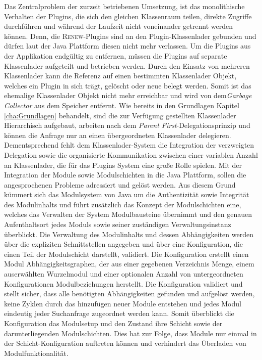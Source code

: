 			Das Zentralproblem der zurzeit betriebenen Umsetzung, ist das monolithische Verhalten der Plugins, die sich den gleichen Klassenraum teilen, direkte Zugriffe durchführen und während der Laufzeit nicht voneinander getrennt werden können. Denn, die \textsc{Renew}-Plugins sind an den Plugin-Klassenlader gebunden und dürfen laut der Java Plattform diesen nicht mehr verlassen. 
			Um die Plugins aus der Applikation endgültig zu entfernen, müssen die Plugins auf separate Klassenlader aufgeteilt und betrieben werden. Durch den Einsatz von mehreren Klassenlader kann die Referenz auf einen bestimmten Klassenlader Objekt, welches ein Plugin in sich trägt, gelöscht oder neue belegt werden. Somit ist das ehemalige Klassenlader Objekt nicht mehr erreichbar und wird von dem\textit{Garbage Collector} aus dem Speicher entfernt.\bigbreak  
			Wie bereits in den Grundlagen Kapitel \ref{cha:Grundlagen} behandelt, sind die zur Verfügung gestellten Klassenlader Hierarchisch aufgebaut, arbeiten nach dem \textit{Parent First}-Delegationsprinzip und können die Anfrage nur an einen übergeordneten Klassenlader delegieren. Dementsprechend fehlt dem Klassenlader-System die Integration der verzweigten Delegation sowie die organisierte Kommunikation zwischen einer variablen Anzahl an Klassenlader, die für das Plugins System eine große Rolle spielen.\newline
			Mit der Integration der Module sowie Modulschichten in die Java Plattform, sollen die angesprochenen Probleme adressiert und gelöst werden. Aus diesem Grund kümmert sich das Modulsystem von Java um die Authentizität sowie Integrität des Modulinhalts und führt zusätzlich das Konzept der Modulschichten eine, welches das Verwalten der System Modulbausteine übernimmt und den genauen Aufenthaltsort jedes Moduls sowie seiner zuständigen Verwaltungsinstanz überblickt.\newline
			Die Verwaltung des Modulinhalts und dessen Abhängigkeiten werden über die expliziten Schnittstellen angegeben  und über eine Konfiguration, die einen Teil der Modulschicht darstellt, validiert. Die Konfiguration erstellt einen Modul Abhängigkeitsgraphen, der aus einer gegebenen Verzeichnis Menge, einem auserwählten Wurzelmodul und einer optionalen Anzahl von untergeordneten Konfigurationen Modulbeziehungen herstellt. Die Konfiguration validiert und stellt sicher, dass alle benötigten Abhängigkeiten gefunden und aufgelöst werden, keine Zyklen durch das hinzufügen neuer Module entstehen und jedes Modul eindeutig jeder Suchanfrage zugeordnet werden kann. Somit überblickt die Konfiguration das Modulsetup und den Zustand ihre Schicht sowie der darunterliegenden Modulschichten. Dies hat zur Folge, dass Module nur einmal in der Schicht-Konfiguration auftreten können und verhindert das Überladen von Modulfunktionalität.\newline

